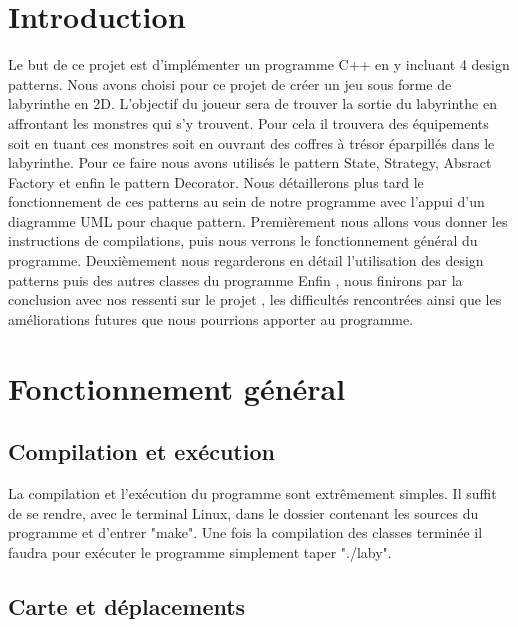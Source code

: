 \documentclass[a4paper]{article}
\author{\docsauthor}
\title{\docstitle}
\date{\today}
\begin{document}
  \maketitle{}
  \thispagestyle{empty}
  \newpage
  \tableofcontents{}
  \newpage
  \section{Introduction}

Le but de ce projet est d’implémenter un programme C++ en y incluant 4 design patterns.
Nous avons choisi pour ce projet de créer un jeu sous forme de labyrinthe en 2D.
L'objectif du joueur sera de trouver la sortie du labyrinthe en affrontant les monstres qui s'y trouvent.
Pour cela il trouvera des équipements soit en tuant ces monstres soit en ouvrant des coffres à trésor éparpillés dans le labyrinthe.
Pour ce faire nous avons utilisés le pattern State, Strategy, Absract Factory et enfin le pattern Decorator.
Nous détaillerons plus tard le fonctionnement de ces patterns au sein de notre programme avec l'appui d'un diagramme UML pour chaque pattern.
Premièrement nous allons vous donner les instructions de compilations, puis nous verrons le fonctionnement général du programme.
Deuxièmement nous regarderons en détail l'utilisation des design patterns puis des autres classes du programme
Enfin , nous finirons par la conclusion avec nos ressenti sur le projet , les difficultés rencontrées ainsi que les améliorations futures que nous pourrions apporter au programme.


  \section{Fonctionnement général}

    \subsection{Compilation et exécution}

La compilation et l’exécution du programme sont extrêmement simples.
Il suffit de se rendre, avec le terminal Linux, dans le dossier contenant les sources du programme et d'entrer "make".
Une fois la compilation des classes terminée il faudra pour exécuter le programme simplement taper "./laby".


    \subsection{Carte et déplacements}
\end{document}
